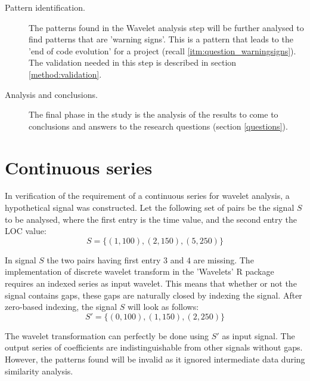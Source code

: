 \begin{description}
	\item[Pattern identification.] The patterns found in the Wavelet analysis step
	will be further analysed to find patterns that are 'warning signs'. This is a
	pattern that leads to the 'end of code evolution' for a project (recall
	\ref{itm:question_warningsigns}). The validation needed in this step is
	described in section \ref{method:validation}.
	
	\item[Analysis and conclusions.] The final phase in the study is the analysis
	of the results to come to conclusions and answers to the research questions
	(section \ref{questions}).
\end{description}

\section{Continuous series}
\label{section:gapless_wavelets}
In verification of the requirement of a continuous series for wavelet analysis,
a hypothetical signal was constructed. Let the following set of pairs be the
signal $S$ to be analysed, where the first entry is the time value, and the
second entry the LOC value:
$$S = \{(1,100), (2,150), (5,250)\}$$

\noindent
In signal $S$ the two pairs having first entry $3$ and $4$ are missing. The
implementation of discrete wavelet transform in the 'Wavelets' R package
requires an indexed series as input wavelet. This means that whether or not
the signal contains gaps, these gaps are naturally closed by indexing the
signal. After zero-based indexing, the signal $S$ will look as follows:
$$S' = \{(0,100), (1,150), (2,250)\}$$

\noindent
The wavelet transformation can perfectly be done using $S'$ as input
signal. The output series of coefficients are indistinguishable from other
signals without gaps. However, the patterns found will be invalid as it ignored
intermediate data during similarity analysis.

